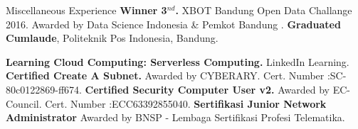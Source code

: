 \begin{rubric}{Miscellaneous Experience}
\entry*[2016]%
	\textbf{Winner 3$^{nd}$.} XBOT Bandung Open Data Challange 2016. Awarded by Data Science Indonesia \& Pemkot Bandung .
%
\entry*[2015] \textbf{Graduated Cumlaude}, Politeknik Pos Indonesia, Bandung.


\entry*[2018]%
	\textbf{Learning Cloud Computing: Serverless Computing.} LinkedIn Learning.
%
\entry*[2017]%
	\textbf{Certified Create A Subnet.} Awarded by CYBERARY. Cert. Number :SC-80c0122869-ff674.
%
\entry*[2017]%
	\textbf{Certified Security Computer User v2.} Awarded by EC-Council. Cert. Number :ECC63392855040.
%
\entry*[2015]%
	\textbf{Sertifikasi Junior Network Administrator} Awarded by BNSP - Lembaga Sertifikasi Profesi Telematika.
%
\end{rubric}